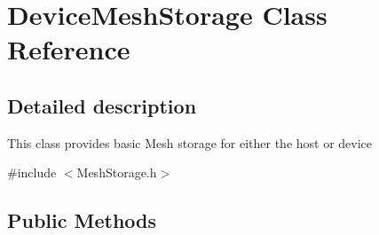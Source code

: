 \hypertarget{class_device_mesh_storage}{}\section{Device\+Mesh\+Storage Class Reference}
\label{class_device_mesh_storage}


\subsection{Detailed description}
This class provides basic Mesh storage for either the host or device 

{\ttfamily \#include $<$Mesh\+Storage.\+h$>$}

\subsection*{Public Methods}
